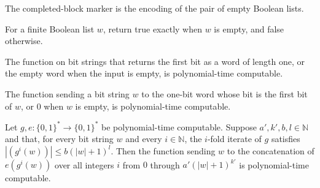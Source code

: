 \begin{definition}
\label{Complexity.blockDone}
\leanok
{}
The completed-block marker is the encoding of the pair of empty Boolean lists.
\end{definition}

\begin{definition}
\label{Complexity.isNilB}
\leanok
For a finite Boolean list $w$, return true exactly when $w$ is empty, and false
otherwise.
\end{definition}

\begin{theorem}
\label{Complexity.polyTimeComputable_take1}
\leanok
{}
The function on bit strings that returns the first bit as a word of length one, or the
empty word when the input is empty, is polynomial-time computable.
\end{theorem}

\begin{theorem}
\label{Complexity.polyTimeComputable_headD}
\leanok
{}
The function sending a bit string $w$ to the one-bit word whose bit is the first bit of
$w$, or $0$ when $w$ is empty, is polynomial-time computable.
\end{theorem}

\begin{theorem}
\label{Complexity.polyTimeComputable_emitIter}
\leanok
{}
Let $g,e:
\{0,1\}^*\to\{0,1\}^*$ be polynomial-time computable. Suppose $a',k',b,l\in\mathbb{N}$
and that, for every bit string $w$ and every $i\in\mathbb{N}$, the $i$-fold iterate of
$g$ satisfies $|(g^{i}(w))|\le b(|w|+1)^l$. Then the function sending $w$ to the
concatenation of $e(g^{i}(w))$ over all integers $i$ from $0$ through $a'(|w|+1)^{k'}$
is polynomial-time computable.
\end{theorem}

